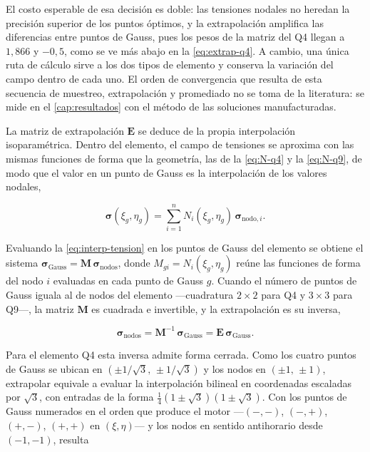 El costo esperable de esa decisión es doble: las tensiones nodales no heredan la precisión superior de los puntos óptimos, y la extrapolación amplifica las diferencias entre puntos de Gauss, pues los pesos de la matriz del Q4 llegan a $1{,}866$ y $-0{,}5$, como se ve más abajo en la \autoref{eq:extrap-q4}. A cambio, una única ruta de cálculo sirve a los dos tipos de elemento y conserva la variación del campo dentro de cada uno. El orden de convergencia que resulta de esta secuencia de muestreo, extrapolación y promediado no se toma de la literatura: se mide en el \autoref{cap:resultados} con el método de las soluciones manufacturadas.

La matriz de extrapolación $\bm{E}$ se deduce de la propia interpolación isoparamétrica. Dentro del elemento, el campo de tensiones se aproxima con las mismas funciones de forma que la geometría, las de la \autoref{eq:N-q4} y la \autoref{eq:N-q9}, de modo que el valor en un punto de Gauss es la interpolación de los valores nodales,

\begin{equation}
\bm{\sigma}(\xi_g,\eta_g) = \sum_{i=1}^{n} N_i(\xi_g,\eta_g)\,\bm{\sigma}_{\text{nodo},i}.
\label{eq:interp-tension}
\end{equation}

Evaluando la \autoref{eq:interp-tension} en los puntos de Gauss del elemento se obtiene el sistema $\bm{\sigma}_{\text{Gauss}} = \bm{M}\,\bm{\sigma}_{\text{nodos}}$, donde $M_{gi} = N_i(\xi_g,\eta_g)$ reúne las funciones de forma del nodo $i$ evaluadas en cada punto de Gauss $g$. Cuando el número de puntos de Gauss iguala al de nodos del elemento —cuadratura $2\times2$ para Q4 y $3\times3$ para Q9—, la matriz $\bm{M}$ es cuadrada e invertible, y la extrapolación es su inversa,

\begin{equation}
\bm{\sigma}_{\text{nodos}} = \bm{M}^{-1}\,\bm{\sigma}_{\text{Gauss}} = \bm{E}\,\bm{\sigma}_{\text{Gauss}}.
\label{eq:extrap-inversa}
\end{equation}

Para el elemento Q4 esta inversa admite forma cerrada. Como los cuatro puntos de Gauss se ubican en $(\pm 1/\sqrt{3},\,\pm 1/\sqrt{3})$ y los nodos en $(\pm 1,\,\pm 1)$, extrapolar equivale a evaluar la interpolación bilineal en coordenadas escaladas por $\sqrt{3}$, con entradas de la forma $\tfrac{1}{4}(1\pm\sqrt{3})(1\pm\sqrt{3})$. Con los puntos de Gauss numerados en el orden que produce el motor —$(-,-)$, $(-,+)$, $(+,-)$, $(+,+)$ en $(\xi,\eta)$— y los nodos en sentido antihorario desde $(-1,-1)$, resulta

